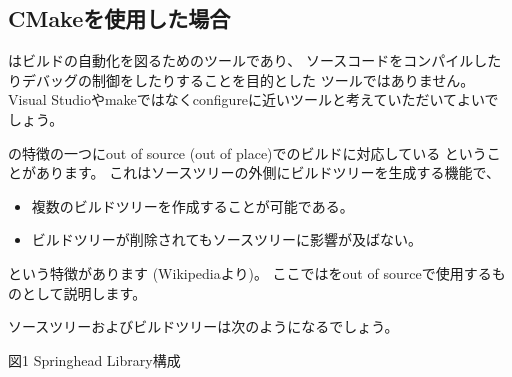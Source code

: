 \newpage
\subsection{CMakeを使用した場合}
\label{subsec:WhatCMakeWillDoWhenUsedCMake}

\cmake はビルドの自動化を図るためのツールであり、
ソースコードをコンパイルしたりデバッグの制御をしたりすることを目的とした
ツールではありません。
Visual Studioやmakeではなくconfigureに近いツールと考えていただいてよいでしょう。

\cmake の特徴の一つにout of source (out of place)でのビルドに対応している
ということがあります。
これはソースツリーの外側にビルドツリーを生成する機能で、
\begin{itemize}
  \item	複数のビルドツリーを作成することが可能である。
  \item	ビルドツリーが削除されてもソースツリーに影響が及ばない。
\end{itemize}
という特徴があります (Wikipediaより)。
ここでは\cmake をout of sourceで使用するものとして説明します。

\medskip
ソースツリーおよびビルドツリーは次のようになるでしょう。

\medskip
\begin{narrow}
    \begin{narrow}\begin{minipage}{\textwidth}
	\medskip
  \end{minipage}\end{narrow}
\end{narrow}
\begin{center}図1 Springhead Library構成 \end{center}

